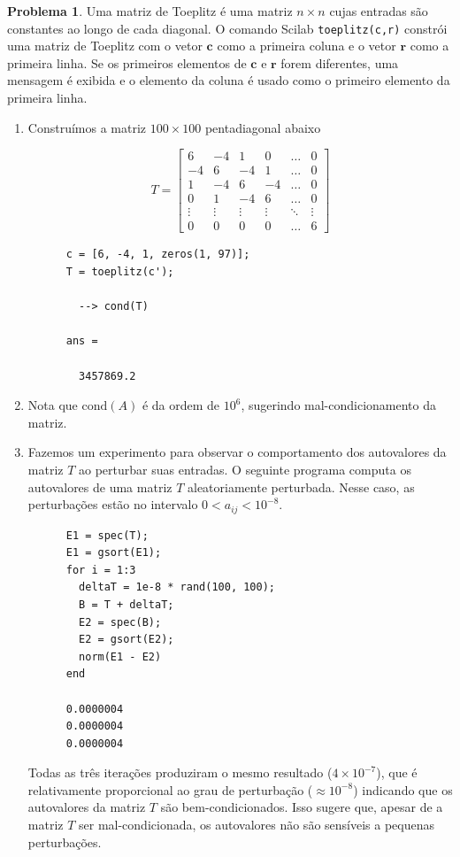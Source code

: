 \documentclass{article}
\theoremstyle{plain}
\theoremstyle{definition}
\newtheorem{prblm}[defn]{Problema}
\theoremstyle{remark}
\begin{document}
\begin{prblm}
  Uma matriz de Toeplitz é uma matriz \(n \times n\) cujas entradas são constantes ao longo de cada diagonal. O comando Scilab \texttt{toeplitz(c,r)} constrói uma matriz de Toeplitz com o vetor \(\mathbf{c}\) como a primeira coluna e o vetor \(\mathbf{r}\) como a primeira linha. Se os primeiros elementos de \(\mathbf{c}\) e \(\mathbf{r}\) forem diferentes, uma mensagem é exibida e o elemento da coluna é usado como o primeiro elemento da primeira linha.

\begin{enumerate}
  \item[(a)] Construímos a matriz \(100\times100\) pentadiagonal abaixo

  \[T = \begin{bmatrix}
    6 & -4 & 1 & 0 & \ldots & 0 \\
    -4 & 6 & -4 & 1 & \ldots & 0 \\
    1 & -4 & 6 & -4 & \ldots & 0 \\
    0 & 1 & -4 & 6 & \ldots & 0 \\
    \vdots & \vdots & \vdots & \vdots & \ddots & \vdots \\
    0 & 0 & 0 & 0 & \ldots & 6
  \end{bmatrix}\]

    \begin{verbatim}
      c = [6, -4, 1, zeros(1, 97)];
      T = toeplitz(c');

        --> cond(T)

      ans =

        3457869.2
    \end{verbatim}

  \item[(b)] Nota que \(\text{cond}(A)\) é da ordem de \(10^6\), sugerindo mal-condicionamento da matriz.

  \item[(c)] Fazemos um experimento para observar o comportamento dos autovalores da matriz \(T\) ao perturbar suas entradas. O seguinte programa computa os autovalores de uma matriz \(T\) aleatoriamente perturbada. Nesse caso, as perturbações estão no intervalo \(0 < a_{ij} < 10^{-8}\).
    \begin{verbatim}
      E1 = spec(T);
      E1 = gsort(E1);
      for i = 1:3
        deltaT = 1e-8 * rand(100, 100);
        B = T + deltaT;
        E2 = spec(B);
        E2 = gsort(E2);
        norm(E1 - E2)
      end

      0.0000004
      0.0000004
      0.0000004
    \end{verbatim}  
      Todas as três iterações produziram o mesmo resultado (\(4\times10^{-7}\)), que é relativamente proporcional ao grau de perturbação (\(\approx10^{-8}\)) indicando que os autovalores da matriz \(T\) são bem-condicionados. Isso sugere que, apesar de a matriz \(T\) ser mal-condicionada, os autovalores não são sensíveis a pequenas perturbações.
\end{enumerate}
\end{prblm}
\end{document}
